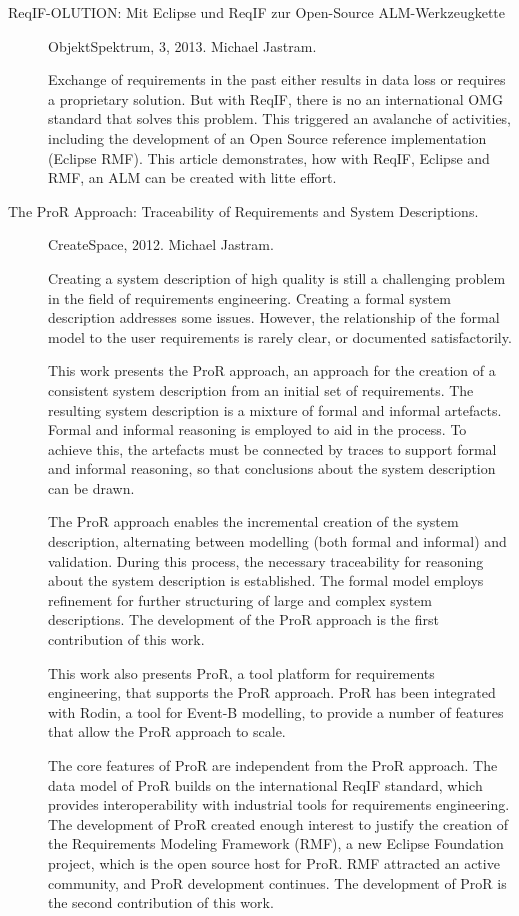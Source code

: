 \begin{description}
\item[ReqIF-OLUTION: Mit Eclipse und ReqIF zur Open-Source ALM-Werkzeugkette] ObjektSpektrum, 3, 2013. Michael Jastram.

Exchange of requirements in the past either results in data loss or requires a proprietary solution. But with ReqIF, there is no an international OMG standard that solves this problem.  This triggered an avalanche of activities, including the development of an Open Source reference implementation (Eclipse RMF).  This article demonstrates, how with ReqIF, Eclipse and RMF, an ALM can be created with litte effort.

\item[The ProR Approach: Traceability of Requirements and System Descriptions.] CreateSpace, 2012. Michael Jastram.

Creating a system description of high quality is still a challenging problem in the field of requirements engineering. Creating a formal system description addresses some issues. However, the relationship of the formal model to the user requirements is rarely clear, or documented satisfactorily.

This work presents the ProR approach, an approach for the creation of a consistent system description from an initial set of requirements. The resulting system description is a mixture of formal and informal artefacts. Formal and informal reasoning is employed to aid in the process. To achieve this, the artefacts must be connected by traces to support formal and informal reasoning, so that conclusions about the system description can be drawn.

The ProR approach enables the incremental creation of the system description, alternating between modelling (both formal and informal) and validation. During this process, the necessary traceability for reasoning about the system description is established. The formal model employs refinement for further structuring of large and complex system descriptions. The development of the ProR approach is the first contribution of this work.

This work also presents ProR, a tool platform for requirements engineering, that supports the ProR approach. ProR has been integrated with Rodin, a tool for Event-B modelling, to provide a number of features that allow the ProR approach to scale.

The core features of ProR are independent from the ProR approach. The data model of ProR builds on the international ReqIF standard, which provides interoperability with industrial tools for requirements engineering. The development of ProR created enough interest to justify the creation of the Requirements Modeling Framework (RMF), a new Eclipse Foundation project, which is the open source host for ProR. RMF attracted an active community, and ProR development continues. The development of ProR is the second contribution of this work.


\end{description}
